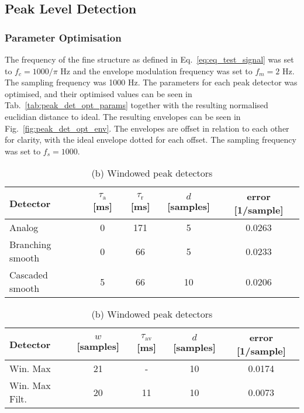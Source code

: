 \documentclass[../main2.tex]{subfiles}
\begin{document}
\subsection{Peak Level Detection}

\subsubsection{Parameter Optimisation}
The frequency of the fine structure as defined in Eq.~\eqref{eq:eq_test_signal} was set to $f_c = 1000/ \pi$ Hz and the envelope modulation frequency was set to $f_m = 2$ Hz. The sampling frequency was 1000 Hz. The parameters for each peak detector was optimised, and their optimised values can be seen in Tab.~\ref{tab:peak_det_opt_params} together with the resulting normalised euclidian distance to ideal. The resulting envelopes can be seen in Fig.~\ref{fig:peak_det_opt_env}. The envelopes are offset in relation to each other for clarity, with the ideal envelope dotted for each offset. The sampling frequency was set to $f_s = 1000$.

\begin{table}[h]
\begin{center}
\caption{Optimised parameters for the various peak detectors, $f_c=1000/\pi $, $f_m=2 $}
\label{tab:peak_det_opt_params}
\caption*{(a) Attack and release peak detectors}
\begin{tabular}{| l | c c c | c |}
	\hline
	Detector 	& $\tau_\text{a}$ [ms] & $\tau_\text{r}$ [ms] & $d$ [samples] & error [1/sample]\\
	\hline
	
	Analog 			& 0 			& 171 	& 5		& 0.0263	\\ 
	Branching smooth 	& 0	 		& 66 	& 5		& 0.0233	\\ 
	Cascaded smooth	& 5			& 66 	& 10		& 0.0206	\\
	\hline
\end{tabular}
\end{center}

\begin{center}
\caption*{(b) Windowed peak detectors}
\label{tab:peak_det_instatt_opt_params}
 \begin{tabular}{| l | c c c | c |}
	\hline
	Detector & $w$ [samples] & $\tau_\text{av}$ [ms] & $d$ [samples] & error [1/sample] \\
	\hline
	Win. Max		& 21		& -		& 10		& 0.0174	\\ 
	Win. Max Filt.	& 20		& 11		& 10		& 0.0073	\\
	\hline
\end{tabular}
\end{center}

\end{table}
\end{document}
